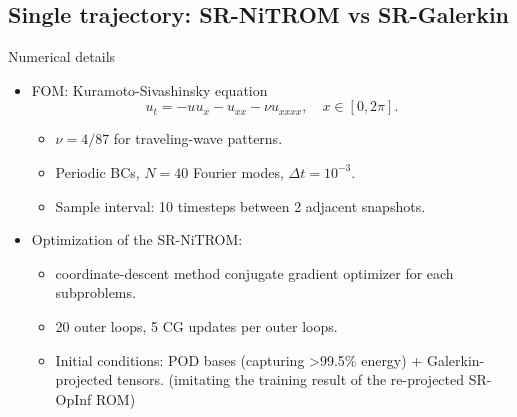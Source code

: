 \documentclass[presentation]{beamer}
\begin{document}
\subsection{Single trajectory: SR-NiTROM vs SR-Galerkin}
\label{sec:org6e7ee9f}
\begin{frame}[label={sec:orgb7ba668}]{Numerical details}
\begin{itemize}[<+->]
\item FOM: Kuramoto-Sivashinsky equation
\begin{equation}
  \label{eq:6}
  u_{t} = -uu_{x} - u_{xx} - \nu u_{xxxx}, \quad x\in[0, 2\pi].
\end{equation}
\begin{itemize}
\item \(\nu = 4/87\) for traveling-wave patterns.
\item Periodic BCs, \(N=40\) Fourier modes, \(\Delta t = 10^{-3}\).
\item Sample interval: 10 timesteps between 2 adjacent snapshots.
\end{itemize}

\item Optimization of the SR-NiTROM:
\begin{itemize}
\item coordinate-descent method
conjugate gradient optimizer for each subproblems.
\item 20 outer loops, 5 CG updates per outer loops.
\item Initial conditions: POD bases (capturing >99.5\% energy) + Galerkin-projected tensors.
(imitating the training result of the re-projected SR-OpInf ROM)
\end{itemize}
\end{itemize}
\end{frame}
\end{document}
